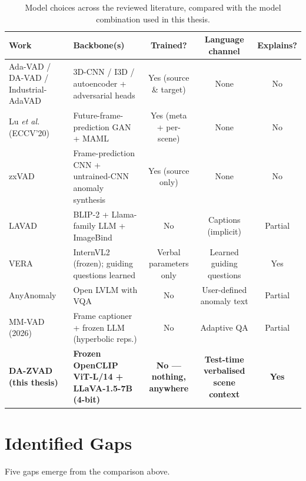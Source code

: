 \documentclass[12pt, a4paper]{article}
\begin{document}
\begin{table}[h!]
\centering
\renewcommand{\arraystretch}{1.4}
\small
\begin{tabularx}{\textwidth}{@{}L{3.4cm} X c c c@{}}
\toprule
\textbf{Work} & \textbf{Backbone(s)} & \textbf{Trained?} & \textbf{Language channel} & \textbf{Explains?} \\
\midrule
Ada-VAD / DA-VAD / Industrial-AdaVAD & 3D-CNN / I3D / autoencoder + adversarial heads & Yes (source \& target) & None & No \\
Lu \textit{et al.} (ECCV'20) & Future-frame-prediction GAN + MAML & Yes (meta + per-scene) & None & No \\
zxVAD & Frame-prediction CNN + untrained-CNN anomaly synthesis & Yes (source only) & None & No \\
LAVAD & BLIP-2 + Llama-family LLM + ImageBind & No & Captions (implicit) & Partial \\
VERA & InternVL2 (frozen); guiding questions learned & Verbal parameters only & Learned guiding questions & Yes \\
AnyAnomaly & Open LVLM with VQA & No & User-defined anomaly text & Partial \\
MM-VAD (2026) & Frame captioner + frozen LLM (hyperbolic reps.) & No & Adaptive QA & Partial \\
\midrule
\textbf{DA-ZVAD (this thesis)} & \textbf{Frozen OpenCLIP ViT-L/14 + LLaVA-1.5-7B (4-bit)} & \textbf{No --- nothing, anywhere} & \textbf{Test-time verbalised scene context} & \textbf{Yes} \\
\bottomrule
\end{tabularx}
\caption{Model choices across the reviewed literature, compared with the model combination used in this thesis.}
\label{tab:models}
\end{table}

\section{Identified Gaps}

Five gaps emerge from the comparison above.
\end{document}
